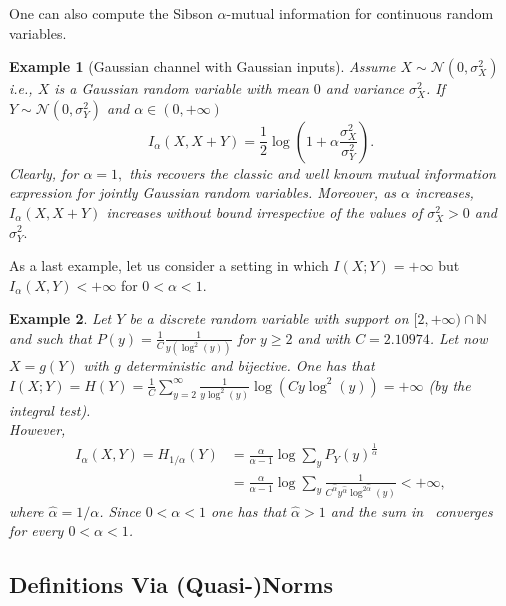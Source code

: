 \documentclass{article}
\numberwithin{theorem}{section}
\newtheorem{example}{Example}
\numberwithin{example}{section}
\numberwithin{remark}{section}
\numberwithin{definition}{section}
\newcommand{\revised}[1]{{\color{black} #1}}
\begin{document}
One can also compute the Sibson $\alpha$-mutual information for continuous random variables.
\begin{example}[Gaussian channel with Gaussian inputs]
Assume $X\sim \mathcal{N}(0,\sigma^2_X)$ \textit{i.e.}, $X$ is a Gaussian random variable with mean $0$ and variance $\sigma^2_X$. If $Y\sim \mathcal{N}(0,\sigma^2_Y)$ and $\alpha \in (0,+\infty)$
\begin{equation}
    I_\alpha(X,X+Y) = \frac{1}{2}\log\left( 1+\alpha \frac{\sigma^2_X}{\sigma^2_Y}\right).
\end{equation}
Clearly, for $\alpha=1,$ this recovers the classic and well known mutual information expression for jointly Gaussian random variables. Moreover, as $\alpha$ increases, $I_\alpha(X,X+Y)$ increases without bound irrespective of the values of $\sigma_X^2>0$ and $\sigma_Y^2.$
\end{example}

\revised{
  As a last example, let us consider a setting in which $I(X;Y)=+\infty$ but $I_\alpha(X,Y)<+\infty$ for $0<\alpha<1$.
  
\begin{example}
   Let $Y$ be a discrete random variable with support on $[2,+\infty)\cap \mathbb{N}$ and such that $P(y)= \frac{1}{C} \frac{1}{y(\log^2(y))}$ for $y\geq 2$ and with $C= 2.10974$. Let now $X=g(Y)$ with $g$ deterministic and bijective. One has that $I(X;Y)=H(Y)=\frac{1}{C}\sum_{y=2}^\infty \frac{1}{y\log^2(y)}\log\left(C y\log^2(y)\right)=+\infty$ (by the integral test).\\
However, \begin{align}
    I_\alpha(X,Y) = H_{1/\alpha}(Y)  
    &= \frac{\alpha}{\alpha-1} \log \sum_y P_Y(y)^\frac{1}{\alpha}  \nonumber \\
    &= \frac{\alpha}{\alpha-1} \log \sum_y \frac{1}{C^{\hat{\alpha}} y^{\hat{\alpha}} \log^{2\hat{\alpha}}(y)} < + \infty, \label{eq:sum}
\end{align}
where $\hat{\alpha}=1/\alpha$. Since $0<\alpha<1$ one has that $\hat{\alpha}>1$ and the sum in~\Cref{eq:sum} converges for every $0<\alpha<1$.
\end{example}
}
\subsection{Definitions Via (Quasi-)Norms}\label{sec:normPerspective}
\end{document}
